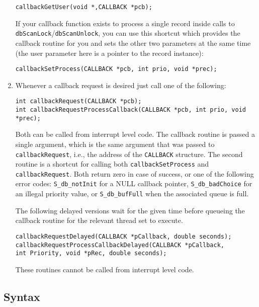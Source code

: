 \begin{enumerate}
\begin{verbatim}
callbackGetUser(void *,CALLBACK *pcb);
\end{verbatim}

If your callback function exists to process a single record inside calls to \verb|dbScanLock|/\verb|dbScanUnlock|, you can use this shortcut which provides the callback routine for you and sets the other two parameters at the same time 
(the user parameter here is a pointer to the record instance):

\begin{verbatim}
callbackSetProcess(CALLBACK *pcb, int prio, void *prec);
\end{verbatim}

\item Whenever a callback request is desired just call one of the following:

\begin{verbatim}
int callbackRequest(CALLBACK *pcb);
int callbackRequestProcessCallback(CALLBACK *pcb, int prio, void *prec);
\end{verbatim}

Both can be called from interrupt level code. The callback routine is passed a single argument, which is the same argument that was passed to \verb|callbackRequest|, i.e., the address of the \verb|CALLBACK| structure. The second routine is a shortcut for calling both \verb|callbackSetProcess| and \verb|callbackRequest|. Both return zero in case of success, or one of the following error codes: \verb|S_db_notInit| for a NULL callback pointer, \verb|S_db_badChoice| for an illegal priority value, or \verb|S_db_bufFull| when the associated queue is full. 

The following delayed versions wait for the given time before queueing the callback routine for the relevant thread set to execute.

\begin{verbatim}
callbackRequestDelayed(CALLBACK *pCallback, double seconds);
callbackRequestProcessCallbackDelayed(CALLBACK *pCallback,
int Priority, void *pRec, double seconds);
\end{verbatim}

These routines cannot be called from interrupt level code.
\end{enumerate}

\subsection{Syntax}


